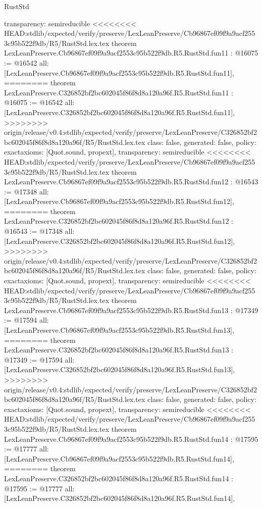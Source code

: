 \begin{lexlean}{RustStd}
\begin{coremodule}
{\begin{coremodule}
{{{{{{{{{{{{{{  transparency: semireducible
}
<<<<<<<< HEAD:stdlib/expected/verify/preserve/LexLeanPreserve/Cb96867ef09f9a9acf2553c95b522f9db/R5/RustStd.lex.tex
theorem LexLeanPreserve.Cb96867ef09f9a9acf2553c95b522f9db.R5.RustStd.fun11 : @16075 := @16542 {
  all: [LexLeanPreserve.Cb96867ef09f9a9acf2553c95b522f9db.R5.RustStd.fun11],
========
theorem LexLeanPreserve.C326852bf2bc602045f86f8d8a120a96f.R5.RustStd.fun11 : @16075 := @16542 {
  all: [LexLeanPreserve.C326852bf2bc602045f86f8d8a120a96f.R5.RustStd.fun11],
>>>>>>>> origin/release/v0.4:stdlib/expected/verify/preserve/LexLeanPreserve/C326852bf2bc602045f86f8d8a120a96f/R5/RustStd.lex.tex
  class: false,
  generated: false,
  policy: exact{axioms: [Quot.sound, propext]},
  transparency: semireducible
}
<<<<<<<< HEAD:stdlib/expected/verify/preserve/LexLeanPreserve/Cb96867ef09f9a9acf2553c95b522f9db/R5/RustStd.lex.tex
theorem LexLeanPreserve.Cb96867ef09f9a9acf2553c95b522f9db.R5.RustStd.fun12 : @16543 := @17348 {
  all: [LexLeanPreserve.Cb96867ef09f9a9acf2553c95b522f9db.R5.RustStd.fun12],
========
theorem LexLeanPreserve.C326852bf2bc602045f86f8d8a120a96f.R5.RustStd.fun12 : @16543 := @17348 {
  all: [LexLeanPreserve.C326852bf2bc602045f86f8d8a120a96f.R5.RustStd.fun12],
>>>>>>>> origin/release/v0.4:stdlib/expected/verify/preserve/LexLeanPreserve/C326852bf2bc602045f86f8d8a120a96f/R5/RustStd.lex.tex
  class: false,
  generated: false,
  policy: exact{axioms: [Quot.sound, propext]},
  transparency: semireducible
}
<<<<<<<< HEAD:stdlib/expected/verify/preserve/LexLeanPreserve/Cb96867ef09f9a9acf2553c95b522f9db/R5/RustStd.lex.tex
theorem LexLeanPreserve.Cb96867ef09f9a9acf2553c95b522f9db.R5.RustStd.fun13 : @17349 := @17594 {
  all: [LexLeanPreserve.Cb96867ef09f9a9acf2553c95b522f9db.R5.RustStd.fun13],
========
theorem LexLeanPreserve.C326852bf2bc602045f86f8d8a120a96f.R5.RustStd.fun13 : @17349 := @17594 {
  all: [LexLeanPreserve.C326852bf2bc602045f86f8d8a120a96f.R5.RustStd.fun13],
>>>>>>>> origin/release/v0.4:stdlib/expected/verify/preserve/LexLeanPreserve/C326852bf2bc602045f86f8d8a120a96f/R5/RustStd.lex.tex
  class: false,
  generated: false,
  policy: exact{axioms: [Quot.sound, propext]},
  transparency: semireducible
}
<<<<<<<< HEAD:stdlib/expected/verify/preserve/LexLeanPreserve/Cb96867ef09f9a9acf2553c95b522f9db/R5/RustStd.lex.tex
theorem LexLeanPreserve.Cb96867ef09f9a9acf2553c95b522f9db.R5.RustStd.fun14 : @17595 := @17777 {
  all: [LexLeanPreserve.Cb96867ef09f9a9acf2553c95b522f9db.R5.RustStd.fun14],
========
theorem LexLeanPreserve.C326852bf2bc602045f86f8d8a120a96f.R5.RustStd.fun14 : @17595 := @17777 {
  all: [LexLeanPreserve.C326852bf2bc602045f86f8d8a120a96f.R5.RustStd.fun14],
}}}}}}}}}}}}}}}}}}
\end{coremodule}}
\end{coremodule}
\end{lexlean}
